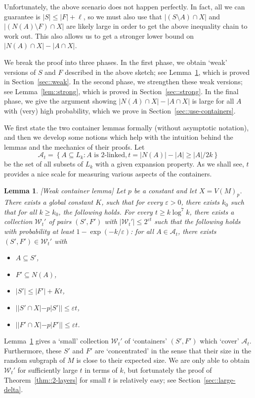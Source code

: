 \documentclass[12pt]{article}
\newcommand{\ep}{\varepsilon}
\newcommand{\A}{\mathcal{A}}
\newtheorem{lemma}[theorem]{Lemma}
\begin{document}
Unfortunately, the above scenario does not happen perfectly. In fact, all we can guarantee is $|S| \leq |F| + \ell$, so we must also use that $|(S \setminus A) \cap X|$ and $|(N(A) \setminus F) \cap X|$ are likely large in order to get the above inequality chain to work out. This also allows us to get a stronger lower bound on $|N(A) \cap X| - |A \cap X|$.

We break the proof into three phases. In the first phase, we obtain `weak' versions of $S$ and $F$ described in the above sketch; see Lemma~\ref{lem::weak}, which is proved in Section~\ref{sec::weak}. In the second phase, we strengthen these weak versions; see Lemma~\ref{lem::strong}, which is proved in Section~\ref{sec::strong}. In the final phase, we give the argument showing $|N(A) \cap X| - |A \cap X|$ is large for all $A$ with (very) high probability, which we prove in Section~\ref{sec::use-containers}.

We first state the two container lemmas formally (without asymptotic notation), and then we develop some notions which help with the intuition behind the lemmas and the mechanics of their proofs. Let
\begin{equation}\label{eq::defA}
\A_t = \left\{ A \subseteq L_k : A \text{ is 2-linked}, t = |N(A)|-|A| \geq |A|/2k \right\}
\end{equation}
be the set of all subsets of $L_k$ with a given expansion property. As we shall see, $t$ provides a nice scale for measuring various aspects of the containers.
\begin{lemma}\label{lem::weak}[Weak container lemma]
Let $p$ be a constant and let $X = V(M)_p$. There exists a global constant $K$, such that for every $\ep>0$, there exists $k_0$ such that for all $k \geq k_0$, the following holds. For every $t \geq k \log^7 k$, there exists a collection $\mathcal{W}_t'$ of pairs $(S',F')$ with $|\mathcal{W}_t'| \leq 2^{\ep t}$ such that the following holds with probability at least $1-\exp(-k/\ep)$: for all $A \in \A_t$, there exists $(S',F') \in \mathcal{W}_t'$ with
\begin{itemize}
\item $A \subseteq S'$,
\item $F' \subseteq N(A)$,
\item $|S'| \leq |F'| + Kt$,
\item $||S' \cap X|-p|S'|| \leq \ep t$,
\item $||F' \cap X|-p|F'|| \leq \ep t$.
\end{itemize}
\end{lemma}
Lemma~\ref{lem::weak} gives a `small' collection $\mathcal{W}_t'$ of `containers' $(S',F')$ which `cover' $\A_t$. Furthermore, these $S'$ and $F'$ are `concentrated' in the sense that their size in the random subgraph of $M$ is close to their expected size. We are only able to obtain $\mathcal{W}_t'$ for sufficiently large $t$ in terms of $k$, but fortunately the proof of Theorem~\ref{thm::2-layers} for small $t$ is relatively easy; see Section~\ref{sec::large-delta}.
\end{document}
